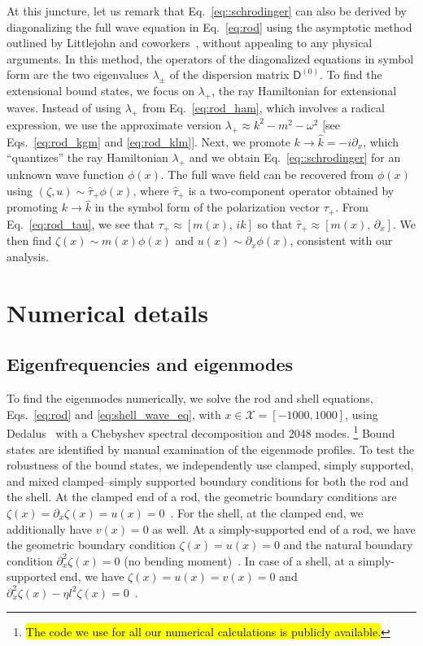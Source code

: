 At this juncture, let us remark that Eq.~\eqref{eq::schrodinger} can also be derived by diagonalizing the full wave equation in Eq.~\eqref{eq:rod} using the asymptotic method outlined by Littlejohn and coworkers~\cite{littlejohn1991,littlejohn1991a,weigert1993}, without appealing to any physical arguments.
In this method, the operators of the diagonalized equations in symbol form are the two eigenvalues $\lambda_{\pm}$ of the dispersion matrix $\mathsf{D}^{(0)}$.
To find the extensional bound states, we focus on $\lambda_{+}$, the ray Hamiltonian for extensional waves.
Instead of using $\lambda_{+}$ from Eq.~\eqref{eq:rod_ham}, which involves a radical expression, we use the approximate version $\lambda_{+} \approx k^{2} - m^{2} - \omega^{2}$ [see Eqs.~\eqref{eq:rod_kgm} and \eqref{eq:rod_klm}].
Next, we promote $k \to \hat{k} = -i\partial_{x}$, which ``quantizes'' the ray Hamiltonian $\lambda_{+}$ and we obtain Eq.~\eqref{eq::schrodinger} for an unknown wave function $\phi(x)$.
The full wave field can be recovered from $\phi(x)$ using $(\zeta, u) \sim \hat{\tau}_{+}\phi(x)$, where $\hat{\tau}_{+}$ is a two-component operator obtained by promoting $k \to \hat{k}$ in the symbol form of the polarization vector $\tau_{+}$.
From Eq.~\eqref{eq:rod_tau}, we see that $\tau_{+} \approx [m(x),\, ik]$ so that $\hat{\tau}_{+} \approx [m(x),\, \partial_{x}]$.
We then find $\zeta(x) \sim m(x)\phi(x)$ and $u(x) \sim \partial_{x}\phi(x)$, consistent with our analysis.

\section{Numerical details}
\label{app:numerical}

\subsection{Eigenfrequencies and eigenmodes}

To find the eigenmodes numerically, we solve the rod and shell equations, Eqs.~\eqref{eq:rod} and \eqref{eq:shell_wave_eq}, with $x \in \mathcal{X} = [-1000, 1000]$, using Dedalus~\cite{burns2020} with a Chebyshev spectral decomposition and 2048 modes.%
\footnote{\hl{The code we use for all our numerical calculations is publicly available.}}
Bound states are identified by manual examination of the eigenmode profiles.
To test the robustness of the bound states, we independently use clamped, simply supported, and mixed clamped--simply supported boundary conditions for both the rod and the shell.
At the clamped end of a rod, the geometric boundary conditions are $\zeta(x) = \partial_{x}\zeta(x) = u(x) = 0$~\cite{kernes2021}.
For the shell, at the clamped end, we additionally have $v(x) = 0$ as well.
At a simply-supported end of a rod, we have the geometric boundary condition $\zeta(x) = u(x) = 0$ and the natural boundary condition $\partial_{x}^{2}\zeta(x) = 0$ (no bending moment)~\cite{fung1965}.
In case of a shell, at a simply-supported end, we have $\zeta(x) = u(x) = v(x) = 0$ and $\partial_{x}^{2}\zeta(x) - \eta l^{2}\zeta(x) = 0$~\cite{yu1955}.

